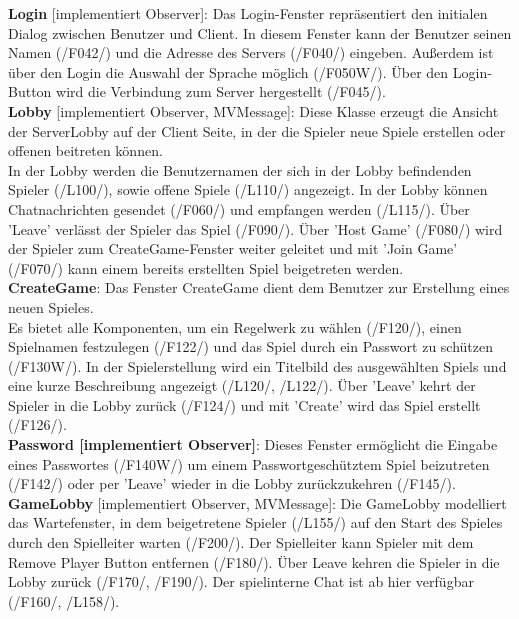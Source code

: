 \documentclass{article}
\begin{document}
\textbf{Login} [implementiert Observer]: Das Login-Fenster repräsentiert den initialen Dialog zwischen Benutzer und Client.
In diesem Fenster kann der Benutzer seinen Namen (/F042/) und die Adresse des Servers (/F040/) eingeben. Außerdem ist über den Login die Auswahl der Sprache möglich (/F050W/). Über den Login-Button wird die Verbindung zum Server hergestellt (/F045/).\\

\textbf{Lobby} [implementiert Observer, MVMessage]: Diese Klasse erzeugt die Ansicht der ServerLobby auf der Client Seite, in der die Spieler neue Spiele erstellen oder offenen beitreten können.\\
In der Lobby werden die Benutzernamen der sich in der Lobby befindenden Spieler (/L100/), sowie offene Spiele (/L110/) angezeigt. In der Lobby können Chatnachrichten gesendet (/F060/) und empfangen werden (/L115/). Über 'Leave' verlässt der Spieler das Spiel (/F090/). Über 'Host Game' (/F080/) wird der Spieler zum CreateGame-Fenster weiter geleitet und mit 'Join Game' (/F070/) kann einem bereits erstellten Spiel beigetreten werden. \\

\textbf{CreateGame}: Das Fenster CreateGame dient dem Benutzer zur Erstellung eines neuen Spieles.\\
Es bietet alle Komponenten, um ein Regelwerk zu wählen (/F120/), einen Spielnamen festzulegen (/F122/) und das Spiel durch ein Passwort zu schützen (/F130W/). In der Spielerstellung wird ein Titelbild des ausgewählten Spiels und eine kurze Beschreibung angezeigt (/L120/, /L122/). Über 'Leave' kehrt der Spieler in die Lobby zurück (/F124/) und mit 'Create' wird das Spiel erstellt (/F126/).\\

\textbf{Password [implementiert Observer]}: Dieses Fenster ermöglicht die Eingabe eines Passwortes (/F140W/) um einem Passwortgeschütztem Spiel beizutreten (/F142/) oder per 'Leave' wieder in die Lobby zurückzukehren (/F145/). \\

\textbf{GameLobby} [implementiert Observer, MVMessage]: Die GameLobby modelliert das Wartefenster, in dem beigetretene Spieler (/L155/) auf den Start des Spieles durch den Spielleiter warten (/F200/).
 Der Spielleiter kann Spieler mit dem Remove Player Button entfernen (/F180/). Über Leave kehren die Spieler in die Lobby zurück (/F170/, /F190/). Der spielinterne Chat ist ab hier verfügbar (/F160/, /L158/). \\
\end{document}
